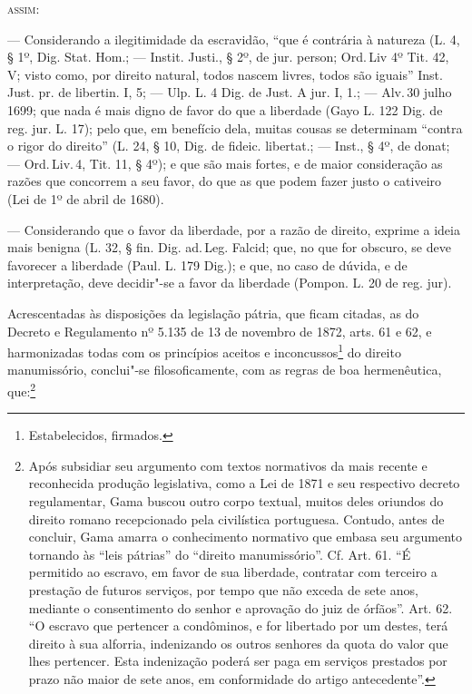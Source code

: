 \textsc{assim}:

--- Considerando a ilegitimidade da escravidão, ``que é contrária à
natureza (L. 4, § 1º, Dig. Stat. Hom.; --- Instit. Justi., § 2º, de jur.
person; Ord.\,Liv 4º Tit. 42, V; visto como, por direito natural, todos
nascem livres, todos são iguais'' Inst. Just. pr. de libertin. I, 5; ---
Ulp. L. 4 Dig. de Just. A jur. I, 1.; --- Alv.\,30 julho 1699; que nada é
mais digno de favor do que a liberdade (Gayo L. 122 Dig. de reg. jur. L.
17); pelo que, em benefício dela, muitas cousas se determinam ``contra o
rigor do direito'' (L. 24, § 10, Dig. de fideic. libertat.; --- Inst., §
4º, de donat; --- Ord.\,Liv.\,4, Tit. 11, § 4º); e que são mais fortes, e de
maior consideração as razões que concorrem a seu favor, do que as que
podem fazer justo o cativeiro (Lei de 1º de abril de 1680).

--- Considerando que o favor da liberdade, por a razão de direito,
exprime a ideia mais benigna (L. 32, § fin. Dig. ad.\,Leg. Falcid; que,
no que for obscuro, se deve favorecer a liberdade (Paul. L. 179 Dig.); e
que, no caso de dúvida, e de interpretação, deve decidir"-se a favor da
liberdade (Pompon. L. 20 de reg. jur).

Acrescentadas às disposições da legislação pátria, que ficam citadas, as
do Decreto e Regulamento nº 5.135 de 13 de novembro de 1872, arts. 61 e
62, e harmonizadas todas com os princípios aceitos e
inconcussos\footnote{Estabelecidos, firmados.} do direito
manumissório, conclui"-se filosoficamente, com as regras de boa
hermenêutica, que:\footnote{Após subsidiar seu argumento com textos
  normativos da mais recente e reconhecida produção legislativa, como a
  Lei de 1871 e seu respectivo decreto regulamentar, Gama buscou outro
  corpo textual, muitos deles oriundos do direito romano recepcionado
  pela civilística portuguesa. Contudo, antes de concluir, Gama amarra o
  conhecimento normativo que embasa seu argumento tornando às ``leis
  pátrias'' do ``direito manumissório''. Cf. Art. 61. ``É permitido ao
  escravo, em favor de sua liberdade, contratar com terceiro a prestação
  de futuros serviços, por tempo que não exceda de sete anos, mediante o
  consentimento do senhor e aprovação do juiz de órfãos''. Art. 62. ``O
  escravo que pertencer a condôminos, e for libertado por um destes,
  terá direito à sua alforria, indenizando os outros senhores da quota
  do valor que lhes pertencer. Esta indenização poderá ser paga em
  serviços prestados por prazo não maior de sete anos, em conformidade
  do artigo antecedente''.}

